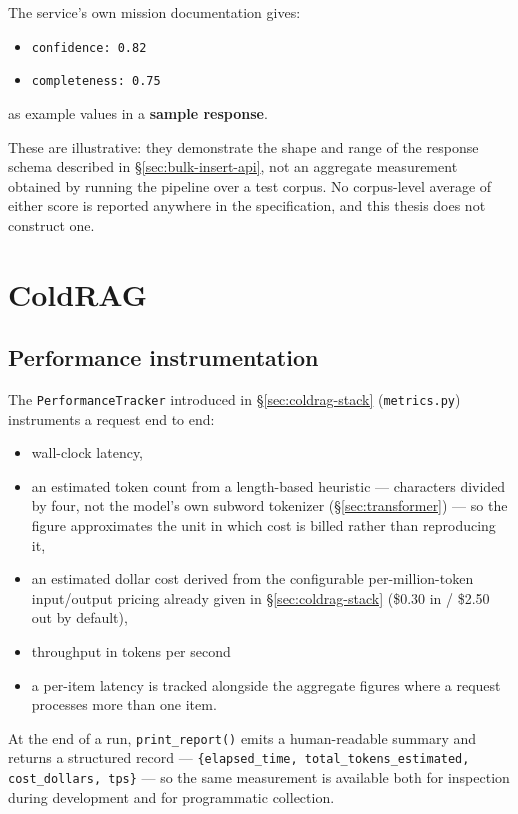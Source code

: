 The service's own mission documentation gives:
\begin{itemize}
\item \texttt{confidence: 0.82}  
\item \texttt{completeness: 0.75} 
\end{itemize}
as example values in a \textbf{sample response}. 

These are illustrative: they demonstrate the shape and range of the response schema described in \S\ref{sec:bulk-insert-api}, not an aggregate measurement obtained by running the pipeline over a test corpus. No corpus-level average of either score is reported anywhere in the specification, and this thesis does not construct one.

\section{ColdRAG}
\label{sec:results-coldrag}

\subsection{Performance instrumentation}
\label{sec:results-coldrag-tracker}

The \texttt{PerformanceTracker} introduced in \S\ref{sec:coldrag-stack} (\texttt{metrics.py}) instruments a request end to end: 
\begin{itemize}
\item wall-clock latency, 
\item an estimated token count from a length-based heuristic — characters divided by four, not the model's own subword tokenizer (\S\ref{sec:transformer}) — so the figure approximates the unit in which cost is billed rather than reproducing it, 
\item an estimated dollar cost derived from the configurable per-million-token input/output pricing already given in \S\ref{sec:coldrag-stack} (\$0.30 in / \$2.50 out by default), 
\item throughput in tokens per second 
\item a per-item latency is tracked alongside the aggregate figures where a request processes more than one item. 
\end{itemize}

At the end of a run, \texttt{print\_report()} emits a human-readable summary and returns a structured record — \texttt{\{elapsed\_time, total\_tokens\_estimated, cost\_dollars, tps\}} — so the same measurement is available both for inspection during development and for programmatic collection.


